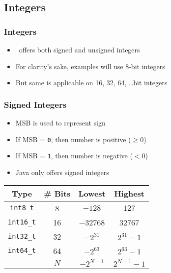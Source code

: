 \subsection{Integers}
\frame{\tableofcontents[currentsubsection]}

\begin{frame}
  \frametitle{Integers}
  \begin{itemize}
    \item \cpp\ offers both signed and unsigned integers
    \item For clarity's sake, examples will use 8-bit integers
    \item But same is applicable on 16, 32, 64, \dots bit integers
  \end{itemize}
\end{frame}

\begin{frame}
  \frametitle{Signed Integers}
  \begin{itemize}
    \item MSB is used to represent sign
    \item If MSB = \texttt{0}, then number is positive ($\geq 0$)
    \item If MSB = \texttt{1}, then number is negative ($< 0$)
    \item Java only offers signed integers
  \end{itemize}
  \begin{center}
  \end{center}
  \begin{center}
    \begin{tabular}{cccc}
      \toprule
      \textbf{Type} & \textbf{\# Bits} & \textbf{Lowest} & \textbf{Highest} \\
      \midrule
      \texttt{int8\_t} & 8 & $-128$ & $127$ \\
      \texttt{int16\_t} & 16 & \num{-32768} & \num{32767} \\
      \texttt{int32\_t} & 32 & $-2^{31}$ & $2^{31}-1$ \\
      \texttt{int64\_t} & 64 & $-2^{63}$ & $2^{63}-1$ \\
      & $N$ & $-2^{N-1}$ & $2^{N-1}-1$ \\
      \bottomrule
    \end{tabular}
  \end{center}
\end{frame}

